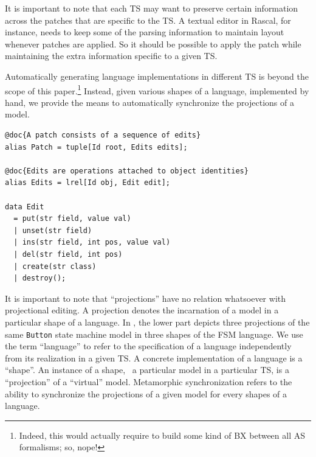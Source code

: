 It is important to note that each TS may want to preserve certain information across the patches that are specific to the TS.
A textual editor in Rascal, for instance, needs to keep some of the parsing information to maintain layout whenever patches are applied.
So it should be possible to apply the patch while maintaining the extra information specific to a given TS.

Automatically generating language implementations in different TS is beyond the scope of this paper.\footnote{Indeed, this would actually require to build some kind of BX between all AS formalisms; so, nope!} Instead, given various shapes of a language, implemented by hand, we provide the means to automatically synchronize the projections of a model.

\begin{lstlisting}[label=lst:delta-adt, caption={CRUD-like \ds structure definition in Rascal}, language=Rascal]
@doc{A patch consists of a sequence of edits}
alias Patch = tuple[Id root, Edits edits];

@doc{Edits are operations attached to object identities}
alias Edits = lrel[Id obj, Edit edit];

data Edit
  = put(str field, value val)
  | unset(str field)
  | ins(str field, int pos, value val)
  | del(str field, int pos)
  | create(str class) 
  | destroy();
\end{lstlisting}

It is important to note that ``projections'' have no relation whatsoever with projectional editing.
A projection denotes the incarnation of a model in a particular shape of a language.
In , the lower part depicts three projections of the same \texttt{Button} state machine model in three shapes of the FSM language.
We use the term ``language'' to refer to the specification of a language independently from its realization in a given TS.
A concrete implementation of a language is a ``shape''.
An instance of a shape, \ie~a particular model in a particular TS, is a ``projection'' of a ``virtual'' model.
Metamorphic synchronization refers to the ability to synchronize the projections of a given model for every shapes of a language.



